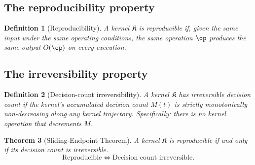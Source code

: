 \documentclass[twocolumn,11pt,a4paper]{article}
\newtheorem{theorem}{Theorem}[section]
\newtheorem{definition}[theorem]{Definition}
\newcommand{\Kernel}{\mathfrak{K}}
\newcommand{\Mcount}{M}
\begin{document}
\subsection{The reproducibility property}

\begin{definition}[Reproducibility]
\label{def:reproducibility}
A kernel $\Kernel$ is \emph{reproducible} if, given the same input under the same operating conditions, the same operation $\op$ produces the same output $O(\op)$ on every execution.
\end{definition}

\subsection{The irreversibility property}

\begin{definition}[Decision-count irreversibility]
\label{def:irreversibility}
A kernel $\Kernel$ has \emph{irreversible decision count} if the kernel's accumulated decision count $\Mcount(t)$ is strictly monotonically non-decreasing along any kernel trajectory. Specifically: there is no kernel operation that decrements $\Mcount$.
\end{definition}

\begin{theorem}[Sliding-Endpoint Theorem]
\label{thm:sliding}
A kernel $\Kernel$ is reproducible if and only if its decision count is irreversible.
\[
\text{Reproducible} \iff \text{Decision count irreversible}.
\]
\end{theorem}
\end{document}
